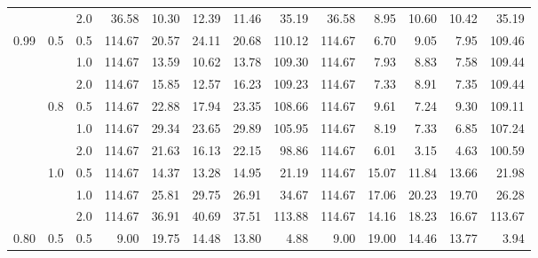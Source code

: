 \documentclass{article}
\begin{document}
{\begin{tabular}{lllrrrrrrrrrr}
          &     & 2.0 &   36.58 &       10.30 &                 12.39 &                    11.46 &          35.19 &   36.58 &        8.95 &                 10.60 &                    10.42 &          35.19 \\
     0.99 & 0.5 & 0.5 &  114.67 &       20.57 &                 24.11 &                    20.68 &         110.12 &  114.67 &        6.70 &                  9.05 &                     7.95 &         109.46 \\
          &     & 1.0 &  114.67 &       13.59 &                 10.62 &                    13.78 &         109.30 &  114.67 &        7.93 &                  8.83 &                     7.58 &         109.44 \\
          &     & 2.0 &  114.67 &       15.85 &                 12.57 &                    16.23 &         109.23 &  114.67 &        7.33 &                  8.91 &                     7.35 &         109.44 \\
          & 0.8 & 0.5 &  114.67 &       22.88 &                 17.94 &                    23.35 &         108.66 &  114.67 &        9.61 &                  7.24 &                     9.30 &         109.11 \\
          &     & 1.0 &  114.67 &       29.34 &                 23.65 &                    29.89 &         105.95 &  114.67 &        8.19 &                  7.33 &                     6.85 &         107.24 \\
          &     & 2.0 &  114.67 &       21.63 &                 16.13 &                    22.15 &          98.86 &  114.67 &        6.01 &                  3.15 &                     4.63 &         100.59 \\
          & 1.0 & 0.5 &  114.67 &       14.37 &                 13.28 &                    14.95 &          21.19 &  114.67 &       15.07 &                 11.84 &                    13.66 &          21.98 \\
          &     & 1.0 &  114.67 &       25.81 &                 29.75 &                    26.91 &          34.67 &  114.67 &       17.06 &                 20.23 &                    19.70 &          26.28 \\
          &     & 2.0 &  114.67 &       36.91 &                 40.69 &                    37.51 &         113.88 &  114.67 &       14.16 &                 18.23 &                    16.67 &         113.67 \\
     0.80 & 0.5 & 0.5 &    9.00 &       19.75 &                 14.48 &                    13.80 &           4.88 &    9.00 &       19.00 &                 14.46 &                    13.77 &           3.94 \\

\end{tabular}}
\end{document}
